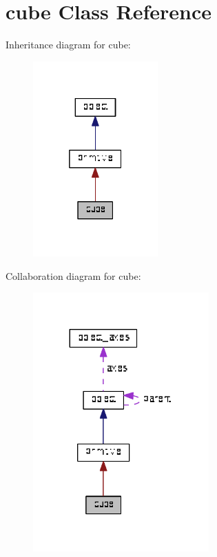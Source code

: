 \hypertarget{classcube}{}\section{cube Class Reference}
\label{classcube}


Inheritance diagram for cube\+:\nopagebreak
\begin{figure}[H]
\begin{center}
\leavevmode
\includegraphics[width=136pt]{classcube__inherit__graph}
\end{center}
\end{figure}


Collaboration diagram for cube\+:\nopagebreak
\begin{figure}[H]
\begin{center}
\leavevmode
\includegraphics[width=191pt]{classcube__coll__graph}
\end{center}
\end{figure}
